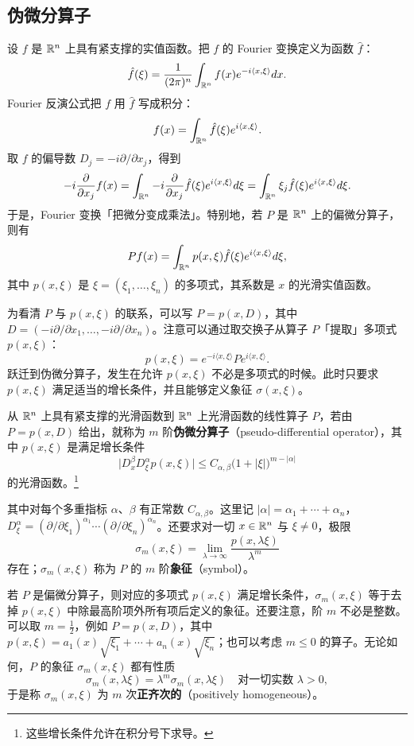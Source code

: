 \subsection{伪微分算子}

设 $f$ 是 $\mathbb{R}^n$ 上具有紧支撑的实值函数。把 $f$ 的 Fourier 变换定义为函数 $\hat f$：
\[
\hat f(\xi)=\frac{1}{(2\pi)^n}\int_{\mathbb{R}^n}f(x)e^{-i\langle x,\xi\rangle}dx.
\]
Fourier 反演公式把 $f$ 用 $\hat f$ 写成积分：
\[
f(x)=\int_{\mathbb{R}^n}\hat f(\xi)e^{i\langle x,\xi\rangle}.
\]
取 $f$ 的偏导数 $D_j=-i\partial/\partial x_j$，得到
\[
-i\frac{\partial}{\partial x_j}f(x)
=\int_{\mathbb{R}^n}-i\frac{\partial}{\partial x_j}\hat f(\xi)e^{i\langle x,\xi\rangle}d\xi
=\int_{\mathbb{R}^n}\xi_j\hat f(\xi)e^{i\langle x,\xi\rangle}d\xi.
\]
于是，Fourier 变换「把微分变成乘法」。特别地，若 $P$ 是 $\mathbb{R}^n$ 上的偏微分算子，则有
\[
Pf(x)=\int_{\mathbb{R}^n}p(x,\xi)\hat f(\xi)e^{i\langle x,\xi\rangle}d\xi,
\]
其中 $p(x,\xi)$ 是 $\xi=(\xi_1,\ldots,\xi_n)$ 的多项式，其系数是 $x$ 的光滑实值函数。

为看清 $P$ 与 $p(x,\xi)$ 的联系，可以写 $P=p(x,D)$，其中 $D=(-i\partial/\partial x_1,\ldots,-i\partial/\partial x_n)$。注意可以通过取交换子从算子 $P$「提取」多项式 $p(x,\xi)$：
\[
p(x,\xi)=e^{-i\langle x,\xi\rangle}Pe^{i\langle x,\xi\rangle}.
\]
跃迁到伪微分算子，发生在允许 $p(x,\xi)$ 不必是多项式的时候。此时只要求 $p(x,\xi)$ 满足适当的增长条件，并且能够定义象征 $\sigma(x,\xi)$。

\begin{definition}
从 $\mathbb{R}^n$ 上具有紧支撑的光滑函数到 $\mathbb{R}^n$ 上光滑函数的线性算子 $P$，若由 $P=p(x,D)$ 给出，就称为 $m$ 阶\textbf{伪微分算子}（pseudo-differential operator），其中 $p(x,\xi)$ 是满足增长条件
\[
\big|D_x^\beta D_\xi^\alpha p(x,\xi)\big|\le C_{\alpha,\beta}\big(1+|\xi|\big)^{m-|\alpha|}
\]
的光滑函数。\footnote{这些增长条件允许在积分号下求导。}
\end{definition}

其中对每个多重指标 $\alpha$、$\beta$ 有正常数 $C_{\alpha,\beta}$。这里记 $|\alpha|=\alpha_1+\cdots+\alpha_n$，$D_\xi^\alpha=(\partial/\partial\xi_1)^{\alpha_1}\cdots\allowbreak(\partial/\partial\xi_n)^{\alpha_n}$。还要求对一切 $x\in\mathbb{R}^n$ 与 $\xi\neq 0$，极限
\[
\sigma_m(x,\xi)=\lim_{\lambda\to\infty}\frac{p(x,\lambda\xi)}{\lambda^m}
\]
存在；$\sigma_m(x,\xi)$ 称为 $P$ 的 $m$ 阶\textbf{象征}（symbol）。

若 $P$ 是偏微分算子，则对应的多项式 $p(x,\xi)$ 满足增长条件，$\sigma_m(x,\xi)$ 等于去掉 $p(x,\xi)$ 中除最高阶项外所有项后定义的象征。还要注意，阶 $m$ 不必是整数。可以取 $m=\frac12$，例如 $P=p(x,D)$，其中 $p(x,\xi)=a_1(x)\sqrt{\xi_1}+\cdots+a_n(x)\sqrt{\xi_n}$；也可以考虑 $m\le 0$ 的算子。无论如何，$P$ 的象征 $\sigma_m(x,\xi)$ 都有性质
\[
\sigma_m(x,\lambda\xi)=\lambda^m\sigma_m(x,\lambda\xi)
\quad\text{对一切实数 }\lambda>0,
\]
于是称 $\sigma_m(x,\xi)$ 为 $m$ 次\textbf{正齐次的}（positively homogeneous）。


